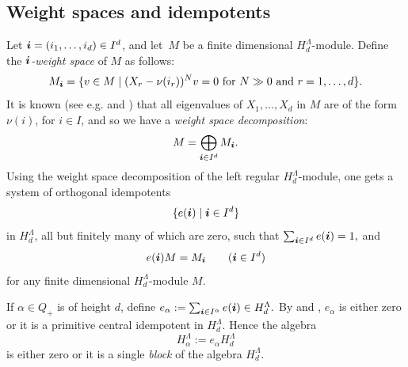 \documentclass[twoside,11pt,reqno]{amsart}
\numberwithin{equation}{section}
\theoremstyle{definition}  %
\def\bi{\text{\boldmath$i$}}
\newcommand{\0}{{\bar 0}}
\newcommand{\1}{{\bar 1}}
\newcommand{\La}{\Lambda}
\newcommand{\al}{\alpha}
\begin{document}


\subsection{Weight spaces and idempotents}
Let $\bi=(i_1,\dots,i_d)\in I^d$, and let~$M$ be a finite dimensional $H_d^\La$-module. Define the
{\em $\bi$-weight space} of $M$ as follows:
$$
M_\bi=\{v\in M\mid (X_r-\nu(i_r))^Nv=0\ \text{for $N\gg0$ and $r=1,\dots,d$}\}.
$$
It is known (see e.g. \cite[Lemma 4.7]{Gr} and \cite[Lemma 7.1.2]{Kbook}) that 
all eigenvalues of $X_1,\dots,X_d$ in $M$ are of the form $\nu(i)$, for $i\in I$, and so we have a {\em weight space decomposition}:
$$
M=\bigoplus_{\bi\in I^d} M_\bi.
$$
Using the weight space decomposition of the left regular $H_d^\La$-module, one gets a system of orthogonal idempotents
\begin{equation}\label{EIdempotents}
\{e(\bi)\mid \bi\in I^d\}
\end{equation}
in $H_d^\La$, all but finitely many of which are zero, such that
$
\sum_{\bi\in I^d}e(\bi)=1,
$
and 
$$
e(\bi)M=M_\bi\qquad(\bi\in I^d)
$$
for any finite dimensional $H_d^\La$-module $M$.

 If $\al\in Q_+$ is of height $d$, define 
$%
e_{\alpha} := \sum_{\bi \in I^\alpha} e(\bi) \in H^\La_d.
$ %
By \cite{LM} and \cite[Theorem~1]{cyclo},
$e_{\alpha}$ is either zero or it is a primitive central idempotent
in $H^\La_d$.
Hence the algebra
\begin{equation}\label{fe}
H^\La_\alpha := e_{\alpha} H^\La_d
\end{equation}
is either zero or it is a single {\em block}
of the algebra $H^\La_d$. 
\end{document}
